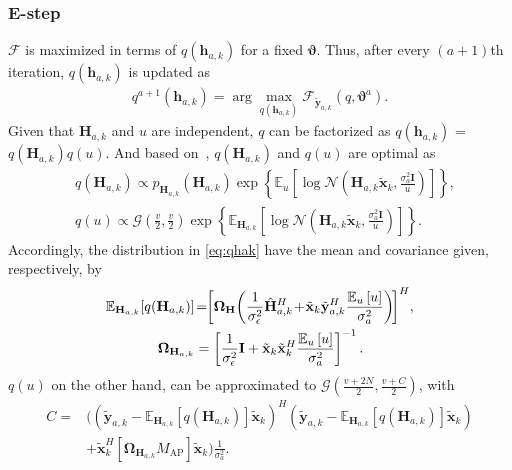 \documentclass[conference,twocolumn,a4paper]{IEEEtran}
\theoremstyle{remark} \newtheorem{remark}{Remark}
\begin{document}
 \subsubsection{E-step} 
 $\mathcal{F}$ is maximized in terms of $q(\mathbf{h}_{a,k})$ for a fixed $\mathbf{\vartheta}$. Thus, after every $(a\!+\!1)$th iteration, $q(\mathbf{h}_{a,k})$ is updated as
\begin{align}
	q^{a+1}(\mathbf{h}_{a,k})=\arg \max _{q(\mathbf{h}_{a,k})} \mathcal{F}_{\tilde{\mathbf{y}}_{a,k}}\!\left(q, \mathbf{\vartheta}^a\right) .
\end{align}
 Given that $\mathbf{H}_{a,k}$ and $u$ are independent, $q$ can be factorized as $q(\mathbf{h}_{a,k})$ = $q(\mathbf{H}_{a,k})q(u)$. And based on~\cite{9882359}, $q(\mathbf{H}_{a,k})$ and $q(u)$ are optimal as
\begin{align}
	&q(\mathbf{H}_{a,k})\!\!\propto p_{\mathbf{H}_{a,k}}\!(\mathbf{H}_{a,k})\!\exp\!\left\{\!\mathbb{E}_{u}\!\left[\!\log\!\mathcal{N}\!\left(\!\mathbf{H}_{a,k}\tilde{\mathbf{x}}_{k}, \frac{\sigma_{a}^2 \mathbf{I}}{u}\!\right)\!\right]\!\right\},\label{eq:qhak} \\
	&q\!\left(u\right)\!\!\propto\mathcal{G}\!\!\left(\!\frac{v}{2}, \frac{v}{2}\right)\!\exp\!\left\{\!\mathbb{E}_{\mathbf{H}_{a,k}}\!\!\left[\!\log \mathcal{N}\!\left(\!\mathbf{H}_{a,k}\tilde{\mathbf{x}}_{k}, \!\frac{\sigma_{a}^2 \mathbf{I}}{u}\!\right)\!\right]\!\right\}\!.\label{eq:qu}
\end{align}
Accordingly, the distribution in \eqref{eq:qhak} have the mean and covariance given, respectively, by
\begin{align}
	\mathbb{E}_{\mathbf{H}_{a,k}}[q(\mathbf{H}_{a,k})] & \!=\!\!\left[\boldsymbol{\Omega}_{\mathbf{H}}\!\left(\frac{1}{\sigma_{\epsilon}^{2}} \Hat{\mathbf{H}}_{a,k}^{H}\!+\!\tilde{\mathbf{x}}_{k} \tilde{\mathbf{y}}_{a,k}^H \frac{\mathbb{E}_{u}\left[u\right]}{\sigma_{a}^2}\right)\!\right]^{H}\!,\label{eq:media}\\
	\boldsymbol{\Omega}_{\mathbf{H}_{a,k}} & =\left[\frac{1}{\sigma_{\epsilon}^{2}} \mathbf{I}+\tilde{\mathbf{x}}_{k}\tilde{\mathbf{x}}_{k}^{H} \frac{\mathbb{E}_{u}\left[u\right]}{\sigma_{a}^2}\right]^{-1}.\label{eq:rowcov}
\end{align}  
$q\left(u\right)$ on the other hand, can be approximated to $\mathcal{G}\!\left(\!\frac{v+2 N}{2},\!\frac{v+C}{2}\!\right)$, with
\begin{align}
	C\!=\!&\Bigg(\!\!\!\left(\tilde{\mathbf{y}}_{a,k}\!-\!\mathbb{E}_{\mathbf{H}_{a,k}}[q(\mathbf{H}_{a,k})] \tilde{\mathbf{x}}_{k}\right)^{H}\!\!\left(\tilde{\mathbf{y}}_{a,k}\!-\!\mathbb{E}_{\mathbf{H}_{a,k}}[q(\mathbf{H}_{a,k})] \tilde{\mathbf{x}}_{k}\right)\nonumber\\&+\tilde{\mathbf{x}}_{k}^{H}\left[\boldsymbol{\Omega}_{\mathbf{H}_{a,k}} M_{\mathrm{AP}}\right] \tilde{\mathbf{x}}_{k}\!\!\Bigg)\frac{1}{\sigma_{a}^2}.
\end{align}
\end{document}
